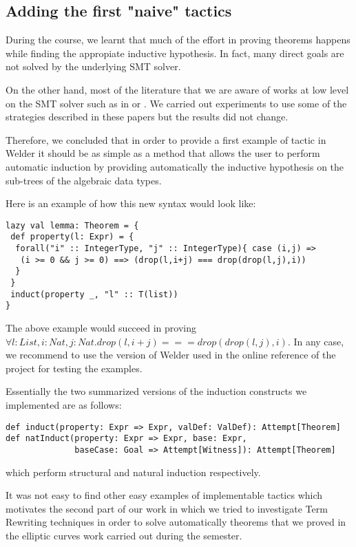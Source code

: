 \subsection{Adding the first "naive" tactics}

During the course, we learnt that much of the effort in proving theorems happens while finding the appropiate inductive hypothesis. In fact, many direct goals are not solved by the underlying SMT solver. 

On the other hand, most of the literature that we are aware of works at low level on the SMT solver such as in \cite{leino} or \cite{kuncak}. We carried out experiments to use some of the strategies described in these papers but the results did not change. 

Therefore, we concluded that in order to provide a first example of tactic in Welder it should be as simple as a method that allows the user to perform automatic induction by providing automatically the inductive hypothesis on the sub-trees of the algebraic data types. 

Here is an example of how this new syntax would look 
like:

\begin{lstlisting}[caption=Proposed induct syntax,captionpos = b]
lazy val lemma: Theorem = {
 def property(l: Expr) = {
  forall("i" :: IntegerType, "j" :: IntegerType){ case (i,j) =>
   (i >= 0 && j >= 0) ==> (drop(l,i+j) === drop(drop(l,j),i))
  }
 }
 induct(property _, "l" :: T(list))
}
\end{lstlisting} 

The above example would succeed in proving $\forall l: List,i:Nat,j:Nat.drop(l,i+j) === drop(drop(l,j),i)$. In any case, we recommend to use the version of Welder used in the online reference of the project \cite{project} for testing the examples. 

Essentially the two summarized versions of the induction constructs we implemented are as follows:

\begin{lstlisting}[caption=Proposed induct signatures to be found in Tactics.scala,captionpos = b]
def induct(property: Expr => Expr, valDef: ValDef): Attempt[Theorem] 
def natInduct(property: Expr => Expr, base: Expr,
              baseCase: Goal => Attempt[Witness]): Attempt[Theorem] 
\end{lstlisting} 
  
which perform structural and natural induction respectively. 

It was not easy to find other easy examples of implementable tactics which motivates the second part of our work in which we tried to investigate Term Rewriting techniques in order to solve automatically theorems that we proved in the elliptic curves work carried out during the semester. 






